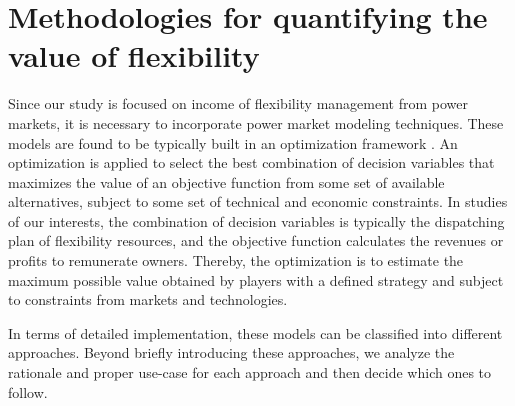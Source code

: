 






\section{Methodologies for quantifying the value of flexibility}
Since our study is focused on income of flexibility management from power markets, it is necessary to incorporate power market modeling techniques. These models are found to be typically built in an optimization framework \cite{Zucker2013,GRUNEWALD2012449,VENTOSA2005897}. An optimization is applied to select the best combination of decision variables that maximizes the value of an objective function from some set of available alternatives, subject to some set of technical and economic constraints. In studies of our interests, the combination of decision variables is typically the dispatching plan of flexibility resources, and the objective function calculates the revenues or profits to remunerate owners. Thereby, the optimization is to estimate the maximum possible value obtained by players with a defined strategy and subject to constraints from markets and technologies. 

In terms of detailed implementation, these models can be classified into different approaches. Beyond briefly introducing these approaches, we analyze the rationale and proper use-case for each approach and then decide which ones to follow.


